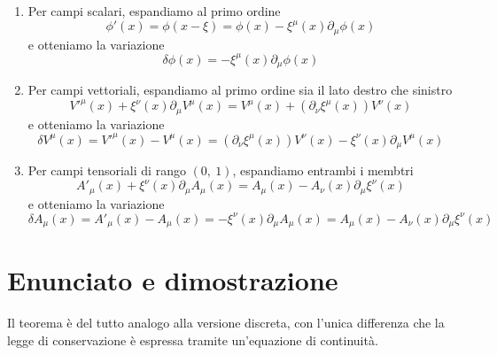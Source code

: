     \begin{enumerate}
        \item Per campi scalari, espandiamo al primo ordine
    \begin{equation*}
        \phi'(x) = \phi(x - \xi) = \phi(x) - \xi^\mu(x) \partial_\mu \phi(x)
    \end{equation*}  
        e otteniamo la variazione
    \begin{equation}\label{variazionescalare}
        \delta \phi(x) = - \xi^\mu(x) \partial_\mu \phi(x)
    \end{equation} 
        \item Per campi vettoriali, espandiamo al primo ordine sia il lato destro che sinistro
    \begin{equation*}
        V'^\mu(x) + \xi^\nu(x) \partial_\mu V^\mu (x) = V^\mu(x) + (\partial_\nu \xi^\mu(x)) V^\nu(x)
    \end{equation*}
        e otteniamo la variazione
    \begin{equation}\label{variazionevett}
        \delta V^\mu(x) = V'^\mu(x) - V^\mu(x) = (\partial_\nu \xi^\mu(x)) V^\nu(x) - \xi^\nu (x)\partial_\mu V^\mu(x)
    \end{equation}
        \item Per campi tensoriali di rango $(0,~1)$, espandiamo entrambi i membtri 
    \begin{equation*}
        A'_\mu(x) + \xi^\nu(x) \partial_\mu A_\mu (x) = A_\mu(x) - A_\nu(x) \partial_\mu \xi^\nu(x)
    \end{equation*}
        e otteniamo la variazione
    \begin{equation}\label{variazione10}
        \delta A_\mu(x) = A'_\mu(x) - A_\mu(x) = - \xi^\nu(x) \partial_\mu A_\mu (x) = A_\mu(x) - A_\nu(x) \partial_\mu \xi^\nu(x)
    \end{equation}
    \end{enumerate}

\section{Enunciato e dimostrazione}
    Il teorema è del tutto analogo alla versione discreta, con l'unica differenza che la legge di conservazione è espressa tramite un'equazione di continuità.

